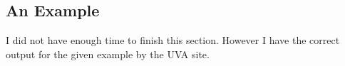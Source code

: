 \documentclass[12pt]{article}
\begin{document}

\subsection{An Example}
I did not have enough time to finish this section. However I have the correct output for the given example by the UVA site.




\end{document}

